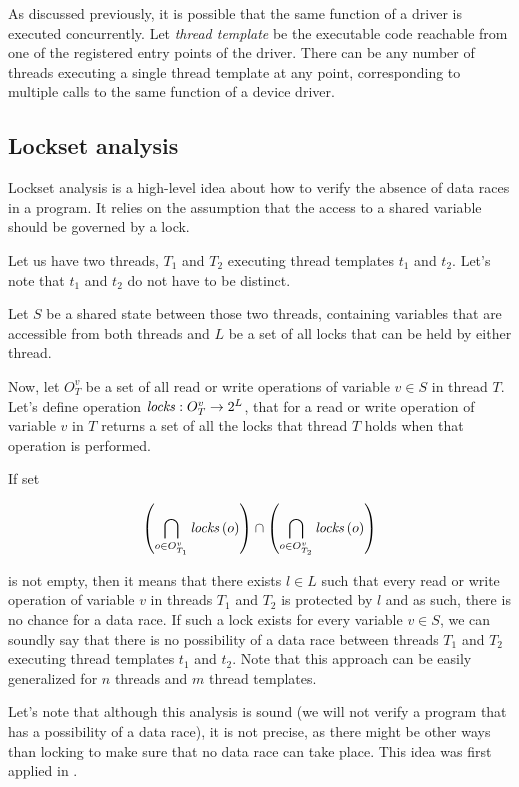 \documentclass[..thesis.tex]{subfiles}
\begin{document}
As discussed previously, it is possible that the same function of a driver is executed concurrently.
Let \textit{thread template} be the executable code reachable from one of the registered entry points of the driver.
There can be any number of threads executing a single thread template at any point, corresponding to multiple calls to the same function of a device driver.

\subsection{Lockset analysis}

Lockset analysis is a high-level idea about how to verify the absence of data races in a program.
It relies on the assumption that the access to a shared variable should be governed by a lock.

Let us have two threads, $T_1$ and $T_2$ executing thread templates $t_1$ and $t_2$. Let's note that $t_1$ and $t_2$ do not have to be distinct.

Let $S$ be a shared state between those two threads,
containing variables that are accessible from both threads and $L$ be a set of all locks that can be held by either thread.

Now, let $O_{T}^v$ be a set of all read or write operations of variable $v \in S$ in thread $T$.
Let's define operation $\mathit{locks} : O_{T}^v \to 2^L$, that for a read or write operation of variable $v$ in $T$ returns a set of all the locks that thread $T$
holds when that operation is performed.

If set

\begin{equation*}
\left( \bigcap \limits_{o \in O_{T_1}^v} \mathit{locks} \left(o \right) \right) \cap  \left( \bigcap \limits_{o \in O_{T_2}^v} \mathit{locks} \left(o \right) \right)
\end{equation*}

is not empty, then it means that there exists $l \in L$ such that every read or write operation of variable $v$ in threads $T_1$ and $T_2$ is protected by $l$ and as such,
there is no chance for a data race. If such a lock exists for every variable $v \in S$, we can soundly say that there is no possibility of a data race between threads $T_1$ and
$T_2$ executing thread templates $t_1$ and $t_2$. Note that this approach can be easily generalized for $n$ threads and $m$ thread templates.

Let's note that although this analysis is sound (we will not verify a program that has a possibility of a data race),
it is not precise, as there might be other ways than locking to make sure that no data race can take place. This idea was first applied in \cite{engler_racerx:_2003}.
\end{document}
